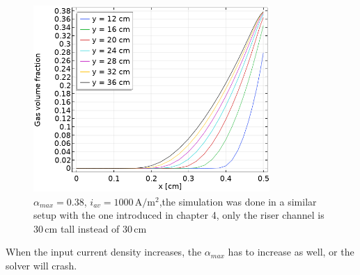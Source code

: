 \begin{figure}[H]
    \centering
    \includegraphics[width=0.8\textwidth]{maxphi0381000A.png}
    \caption{$\alpha_{max}=0.38$, $i_{av}=1000 \, \mathrm{A/m^2}$,the simulation was done in a similar setup with the one introduced in chapter 4, only the riser channel is $30 \, \mathrm{cm}$ tall instead of $30 \, \mathrm{cm}$}
    \label{038phim}
\end{figure}

When the input current density increases, the $\alpha_{max}$ has to increase as well, or the solver will crash.